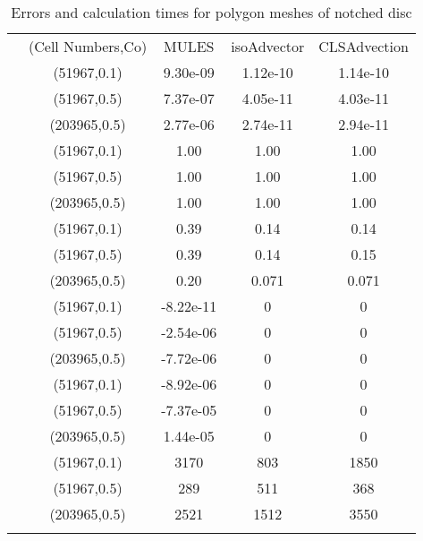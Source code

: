 \begin{table}
\centering
\caption{Errors and calculation times for polygon meshes of notched disc}
\label{Tab:02}
\begin{tabular}{ccccc}
\hline\noalign{\smallskip}
\quad &(Cell Numbers,Co) & MULES &isoAdvector &CLSAdvection  \\
\noalign{\smallskip}\hline\noalign{\smallskip}
\multirow{5}{*}{$\varepsilon_{V}$}
&(51967,0.1)& 9.30e-09 &1.12e-10 &1.14e-10  \\
&(51967,0.5) & 7.37e-07 &4.05e-11 &4.03e-11\\
&(203965,0.5)& 2.77e-06 &2.74e-11 &2.94e-11\\
\hline\noalign{\smallskip}
\multirow{5}{*}{$\varepsilon_{M}$}
&(51967,0.1)& 1.00 &1.00 &1.00  \\
&(51967,0.5) & 1.00 &1.00 &1.00\\
&(203965,0.5)& 1.00 &1.00 &1.00\\
\hline\noalign{\smallskip}
\multirow{5}{*}{$\varepsilon_{S}$}
&(51967,0.1)& 0.39 &0.14 &0.14  \\
&(51967,0.5) & 0.39 &0.14 &0.15\\
&(203965,0.5)& 0.20 &0.071 &0.071\\
\hline\noalign{\smallskip}
\multirow{5}{*}{$\min(\alpha)$}
&(51967,0.1)& -8.22e-11 &0 &0  \\
&(51967,0.5) & -2.54e-06 &0 &0\\
&(203965,0.5)& -7.72e-06 &0 &0\\
\hline\noalign{\smallskip}
\multirow{5}{*}{$\max(\alpha)-1$}
&(51967,0.1)& -8.92e-06 &0 &0  \\
&(51967,0.5) & -7.37e-05 &0 &0\\
&(203965,0.5)& 1.44e-05 &0 &0\\
\hline\noalign{\smallskip}
\multirow{5}{*}{$T_{calc}$}
&(51967,0.1)& 3170 &803 &1850  \\
&(51967,0.5) & 289 &511 &368\\
&(203965,0.5)& 2521 &1512 &3550\\
\noalign{\smallskip}\hline
\end{tabular}
\end{table}
